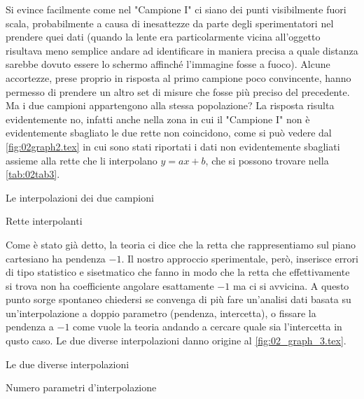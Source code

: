 Si evince facilmente come nel "Campione I" ci siano dei punti visibilmente fuori scala, probabilmente a causa di
 inesattezze da parte degli sperimentatori nel prendere quei dati (quando la lente era particolarmente vicina all'oggetto risultava
 meno semplice andare ad identificare in maniera precisa a quale distanza sarebbe dovuto essere lo schermo affinché l'immagine
 fosse a fuoco). Alcune accortezze, prese proprio in risposta al primo campione poco convincente, hanno permesso di prendere
 un altro set di misure che fosse più preciso del precedente. Ma i due campioni appartengono alla stessa popolazione? La risposta
 risulta evidentemente no, infatti anche nella zona in cui il "Campione I" non è evidentemente sbagliato le due rette non coincidono,
 come si può vedere dal \autoref{fig:02graph2.tex} in cui sono stati riportati i dati non evidentemente sbagliati assieme alla rette
 che li
 interpolano $y = ax + b$, che si possono trovare nella \autoref{tab:02tab3}.
\begin{grafico} \centering  \caption{Le interpolazioni dei due campioni} \label{fig:02graph2.tex} \end{grafico}
\begin{tabella}
	\centering
	
	\caption{Rette interpolanti}
	\label{tab:02tab3}
\end{tabella}

Come è stato già detto, la teoria ci dice che la retta che rappresentiamo sul piano cartesiano ha pendenza $-1$. Il nostro approccio
 sperimentale, però, inserisce errori di tipo statistico e sisetmatico che fanno in modo che la retta che effettivamente si trova
 non ha coefficiente angolare esattamente $-1$ ma ci si avvicina. A questo punto sorge spontaneo chiedersi se convenga di più fare
 un'analisi dati basata su un'interpolazione a doppio parametro (pendenza, intercetta), o fissare la pendenza a $-1$ come vuole la
 teoria andando a cercare quale sia l'intercetta in qusto caso. Le due diverse interpolazioni danno origine al
 \autoref{fig:02_graph_3.tex}.
\begin{grafico} \centering  \caption{Le due diverse interpolazioni} \label{fig:02_graph_3.tex} \end{grafico}
\begin{tabella}
	\centering
	
	\caption{Numero parametri d'interpolazione}
	\label{tab:02tab4}
\end{tabella}

